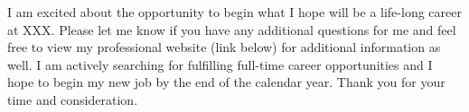 \documentclass[11pt,a4paper,sans]{moderncv}
\begin{document}
	
	\vspace{.5cm} 
	
	I am excited about the opportunity to begin what I hope will be a life-long career at XXX. Please let me know if you have any additional questions for me and feel free to view my professional website (link below) for additional information as well. I am actively searching for fulfilling full-time career opportunities and I hope to begin my new job by the end of the calendar year. Thank you for your time and consideration.\\
	
	\vspace{1cm}
	
	\makeletterclosing
	
\end{document}
